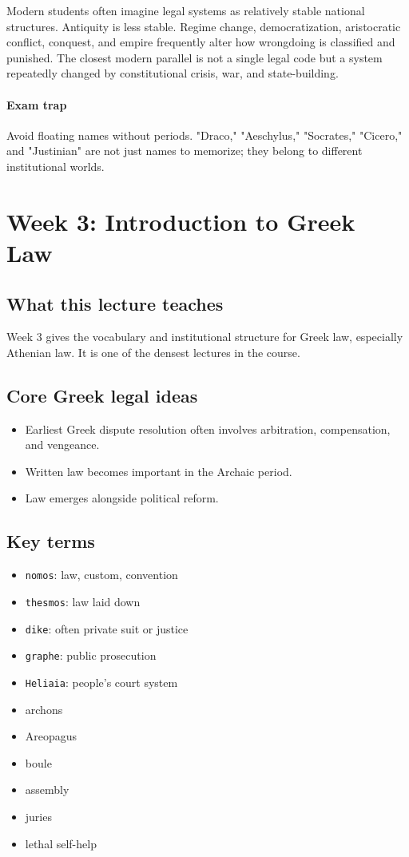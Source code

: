 \documentclass[11pt]{article}
\begin{document}
Modern students often imagine legal systems as relatively stable national structures. Antiquity is less stable. Regime change, democratization, aristocratic conflict, conquest, and empire frequently alter how wrongdoing is classified and punished. The closest modern parallel is not a single legal code but a system repeatedly changed by constitutional crisis, war, and state-building.

\paragraph{Exam trap}

Avoid floating names without periods. "Draco," "Aeschylus," "Socrates," "Cicero," and "Justinian" are not just names to memorize; they belong to different institutional worlds.

\section{Week 3: Introduction to Greek Law}

\subsection{What this lecture teaches}

Week 3 gives the vocabulary and institutional structure for Greek law, especially Athenian law. It is one of the densest lectures in the course.

\subsection{Core Greek legal ideas}

\begin{itemize}
\item Earliest Greek dispute resolution often involves arbitration, compensation, and vengeance.
\item Written law becomes important in the Archaic period.
\item Law emerges alongside political reform.
\end{itemize}

\subsection{Key terms}

\begin{itemize}
\item \texttt{nomos}: law, custom, convention
\item \texttt{thesmos}: law laid down
\item \texttt{dike}: often private suit or justice
\item \texttt{graphe}: public prosecution
\item \texttt{Heliaia}: people's court system
\item archons
\item Areopagus
\item boule
\item assembly
\item juries
\item lethal self-help
\end{itemize}
\end{document}
